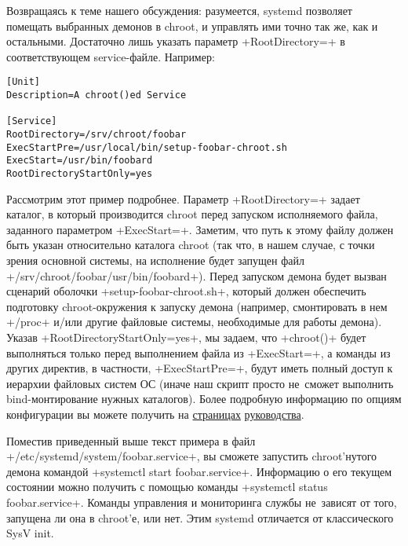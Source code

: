 \documentclass[10pt,oneside,a4paper]{article}
\begin{document}
Возвращаясь к теме нашего обсуждения: разумеется, systemd позволяет помещать
выбранных демонов в chroot, и управлять ими точно так же, как и остальными.
Достаточно лишь указать параметр +RootDirectory=+ в соответствующем
service-файле. Например:
\begin{Verbatim}
[Unit]
Description=A chroot()ed Service

[Service]
RootDirectory=/srv/chroot/foobar
ExecStartPre=/usr/local/bin/setup-foobar-chroot.sh
ExecStart=/usr/bin/foobard
RootDirectoryStartOnly=yes
\end{Verbatim}

Рассмотрим этот пример подробнее. Параметр +RootDirectory=+ задает каталог, в
который производится chroot перед запуском исполняемого файла, заданного
параметром +ExecStart=+. Заметим, что путь к этому файлу должен быть указан
относительно каталога chroot (так что, в нашем случае, с точки зрения основной
системы, на исполнение будет запущен файл +/srv/chroot/foobar/usr/bin/foobard+).
Перед запуском демона будет вызван сценарий оболочки +setup-foobar-chroot.sh+,
который должен обеспечить подготовку chroot-окружения к запуску демона
(например, смонтировать в нем +/proc+ и/или другие файловые системы, необходимые
для работы демона). Указав +RootDirectoryStartOnly=yes+, мы задаем, что
+chroot()+ будет выполняться только перед выполнением файла из +ExecStart=+, а
команды из других директив, в частности, +ExecStartPre=+, будут иметь полный
доступ к иерархии файловых систем ОС (иначе наш скрипт просто не~сможет
выполнить bind-монтирование нужных каталогов). Более подробную информацию по
опциям конфигурации вы можете получить на
\href{http://0pointer.de/public/systemd-man/systemd.service.html}{страницах}
\href{http://0pointer.de/public/systemd-man/systemd.exec.html}{руководства}.

Поместив приведенный выше текст примера в файл
+/etc/systemd/system/foobar.service+, вы сможете запустить chroot'нутого демона
командой +systemctl start foobar.service+. Информацию о его текущем состоянии
можно получить с помощью команды +systemctl status foobar.service+. Команды
управления и мониторинга службы не~зависят от того, запущена ли она в chroot'е,
или нет. Этим systemd отличается от классического SysV init.
\end{document}
